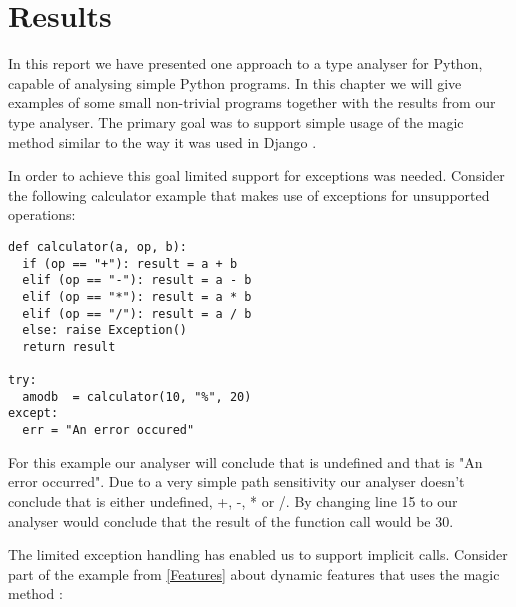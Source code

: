 \chapter{Results}
\label{chapter:results}
In this report we have presented one approach to a type analyser for Python, capable of analysing simple Python programs. In this chapter we will give examples of some small non-trivial programs together with the results from our type analyser. The primary goal was to support simple usage of the magic method  similar to the way it was used in Django \cite{django}.


In order to achieve this goal limited support for exceptions was needed. Consider the following calculator example that makes use of exceptions for unsupported operations:

\begin{listing}[H]
	\begin{verbatim}
def calculator(a, op, b):
  if (op == "+"): result = a + b
  elif (op == "-"): result = a - b
  elif (op == "*"): result = a * b
  elif (op == "/"): result = a / b
  else: raise Exception()
  return result

try:
  amodb  = calculator(10, "%", 20)
except:
  err = "An error occured"
	\end{verbatim}
\end{listing}

For this example our analyser will conclude that  is undefined and that  is "An error occurred". Due to a very simple path sensitivity our analyser doesn't conclude that  is either undefined, +, -, * or /. By changing line 15 to  our analyser would conclude that the result of the function call would be 30.

The limited exception handling has enabled us to support implicit  calls. Consider part of the  example from \autoref{Features} about dynamic features that uses the magic method :


